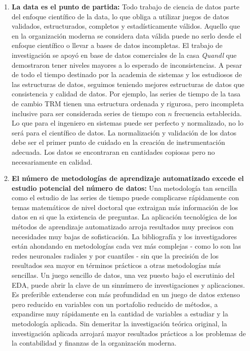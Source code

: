 \begin{enumerate}
    \item \textbf{La data es el punto de partida:} Todo trabajo de ciencia de datos parte del enfoque científico de la data, lo que obliga a utilizar juegos de datos validados, estructurados, completos y estadísticamente válidos. Aquello que en la organización moderna se considera data válida puede no serlo desde el enfoque científico o llevar a bases de datos incompletas. El trabajo de investigación se apoyó en base de datos comerciales de la casa \emph{Quandl} que demostraron tener niveles mayores a lo esperado de inconsistencias. A pesar de todo el tiempo destinado por la academia de sistemas y los estudiosos de las estructuras de datos, seguimos teniendo mejores estructuras de datos que consistencia y calidad de datos. Por ejemplo, las series de tiempo de la tasa de cambio TRM tienen una estructura ordenada y rigurosa, pero incompleta inclusive para ser considerada series de tiempo con $n$ frecuencia establecida. Lo que para el ingeniero en sistemas puede ser perfecto y normalizado, no lo será para el científico de datos. La normalización y validación de los datos debe ser el primer punto de cuidado en la creación de instrumentación adecuada. Los datos se encontraran en cantidades copiosas pero no necesariamente en calidad. 
    \item \textbf{El número de metodologías de aprendizaje automatizado excede el estudio potencial del número de datos:} Una metodología tan sencilla como el estudio de las series de tiempo puede complicarse rápidamente con temas matemáticos de nivel doctoral que extraigan más información de los datos en si que la existencia de preguntas. La aplicación tecnológica de los métodos de aprendizaje automatizado arroja resultados muy precisos con necesidades muy bajas de sofisticación. La bibliografía y los investigadores están ahondando en metodologías cada vez más complejas - como lo son las redes neuronales radiales y por cuantiles - sin que la precisión de los resultados sea mayor en términos prácticos a otras metodologías más sencillas. Un juego sencillo de datos, una vez puesto bajo el escrutinio del EDA, puede abrir la clave de un sinnúmero de investigaciones y aplicaciones. Es preferible extenderse con más profundidad en un juego de datos extenso pero reducido en variables con un portafolio reducido de métodos, a expandirse muy rápidamente en la cantidad de variables a estudiar y la metodología aplicada. Sin demeritar la investigación teórica original, la investigación aplicada arrojará mayor resultados prácticos a los problemas de la contabilidad y finanzas de la organización moderna.

\end{enumerate}
